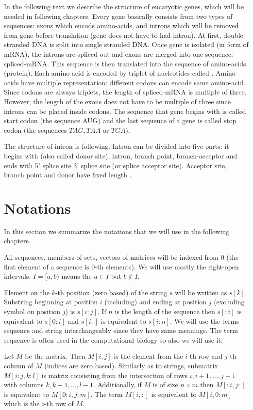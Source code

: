 In the following text we describe the structure of eucaryotic genes, which will be
needed in following chapters. Every gene basically consists from two types of
sequences: exons which encods amino-acids, and introns which will be removed
from gene before translation (gene does not have to had intron). At first,
double stranded DNA is split into single stranded DNA. Once gene is isolated (in
form of mRNA), the introns are spliced out and exons are merged into one
sequence: spliced-mRNA. This sequence is then translated into the sequence of
amino-acids (protein). Each amino acid is encoded by triplet of nucleotides
called . Amino-acids have multiple representation: different
codons can encode same amino-acid. Since codons are always triplets, the length
of spliced-mRNA is multiple of three. However, the length of the exons does not
have to be multiple of three since introns can be placed inside codons.  The
sequence that gene begins with is called start codon (the sequence AUG) and the
last sequence of a gene is called stop codon (the sequences $TAG,TAA$ or $TGA$).

The structure of intron is following. Intron can be divided into five parts: it
begins with (also called donor site), intron, branch point, branch-acceptor and
ends with 5' splice site  3' splice site (or splice acceptor site).  Acceptor
site, branch point and donor have fixed length
\cite{Pairagon2009,UnderstandingBioinformatics}.


\section{Notations}

In this section we summarize the notations that we will use in the following
chapters.

All sequences, members of sets, vectors of matrices will be indexed from $0$
(the first element of a sequence is $0$-th elements). We will use mostly
the right-open intervals: $I=[a,b)$ means the $a\in I$ but $b\notin I$. 

Element on the $k$-th position (zero based) of the string $s$
will be written as $s[k]$. Substring beginning at position $i$ (including) and
ending at position $j$ (excluding symbol on position $j$) is $s[i:j]$.  If $n$
is the length of the sequence then $s[:i]$ is equivalent to $s[0:i]$ and $s[i:]$
is equivalent to $s[i:n]$.  We will use the terms sequence and string
interchangeably since they have same meanings. The term sequence is often used
in the computational biology so also we will use it.

Let $M$ be the matrix. Then $M[i,j]$ is the element from the $i$-th row and
$j$-th column of $M$ (indices are zero based). Similarly as to strings,
submatrix $M[i:j,k:l]$ is matrix consisting from the intersection of rows
$i,i+1,\dots, j-1$ with columns $k,k+1,\dots,l-1$. Additionally, if $M$ is of
size $n\times m$ then $M[:i,j:]$ is equivalent to $M[0:i,j:m]$.  The term
$M[i,:]$ is equivalent to $M[i,0:m]$ which is the $i$-th row of $M$.
